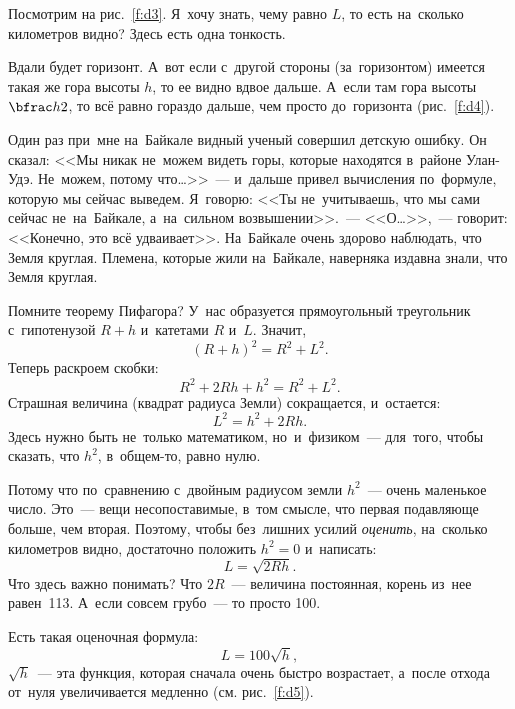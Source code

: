 
Посмотрим на рис.~\ref{f:d3}.
Я~хочу знать, чему равно $L$, то есть на~сколько километров видно? Здесь есть одна тонкость.

\pagebreak

Вдали будет горизонт. А~вот если с~другой стороны (за~горизонтом) имеется такая же гора высоты $h$,
то ее видно вдвое дальше.
 А~если там гора высоты $\bfrac h2$, то всё равно гораздо дальше, чем просто
до~горизонта (рис.~\ref{f:d4}).


Один раз при~мне на~Байкале видный ученый совершил детскую ошибку. Он сказал: <<Мы никак не~можем
видеть горы, которые находятся в~районе Улан-Удэ. Не~можем, потому что\ldots>>~--- и~дальше привел
вычисления по~формуле, которую мы сейчас выведем. Я~говорю: <<Ты не~учитываешь, что мы сами сейчас
не~на~Байкале, а~на~сильном возвышении>>.~--- <<О\ldots>>,~--- говорит: <<Конечно, это всё удваивает>>.
На~Байкале очень здорово наблюдать, что Земля круглая. Племена, которые жили на~Байкале, наверняка
издавна знали, что Земля круглая.

Помните теорему Пифагора? У~нас образуется прямоугольный треугольник с~гипотенузой $R+h$ и~катетами $R$ и~$L$. Значит,
$$
(R+h)^{2}=R^{2}+L^{2}.
$$
Теперь раскроем скобки:
$$
R^{2}+2Rh+h^{2}=R^{2}+L^{2}.
$$
Страшная величина (квадрат радиуса Земли) сокращается, и~оста\-ет\-ся:
$$
L^{2}=h^{2}+2Rh.
$$
Здесь нужно быть не~только математиком, но~и~физиком~--- для~того, чтобы сказать, что $h^{2}$,
в~общем-то, равно нулю.

Потому что по~сравнению с~двойным радиусом земли $h^{2}$~--- очень маленькое число. Это~--- вещи
несопоставимые, в~том смысле, что первая подавляюще больше, чем вторая. Поэтому, чтобы без~лишних
усилий \textit{оценить}, на~сколько километров видно, достаточно положить $h^{2}=0$ и~написать:
$$
L=\sqrt{2Rh}.
$$
Что здесь важно понимать? Что $2R$~--- величина постоянная, корень из~нее равен~113. А~если совсем
грубо~--- то просто 100.


Есть такая оценочная формула:
$$
L=100\sqrt{h},
$$
$\sqrt{h}$~--- эта функция, которая сначала очень быстро возрастает, а~после отхода от~нуля
увеличивается медленно (см. рис.~\ref{f:d5}).


